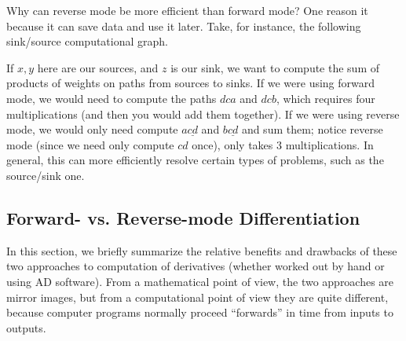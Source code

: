 \begin{figure}[ht]
\begin{center}
\end{center}
\end{figure}

Why can reverse mode be more efficient than forward mode? One reason it because it can save data and use it later. Take, for instance, the following sink/source computational graph.

If $x,y$ here are our sources, and $z$ is our sink, we want to compute the sum of products of weights on paths from sources to sinks. If we were using forward mode, we would need to compute the paths $dca$ and $dcb$, which requires four multiplications (and then you would add them together). If we were using reverse mode, we would only need compute $a\underline{cd}$ and $b\underline{cd}$ and sum them; notice reverse mode (since we need only compute $cd$ once), only takes 3 multiplications. In general, this can more efficiently resolve certain types of problems, such as the source/sink one.

\subsection{Forward- vs. Reverse-mode Differentiation}
\label{sec:forward-vs-reverse}

In this section, we briefly summarize the relative benefits and drawbacks of these two approaches to computation of derivatives (whether worked out by hand or using AD software).  From a mathematical point of view, the two approaches are mirror images, but from a computational point of view they are quite different, because computer programs normally proceed ``forwards'' in time from inputs to outputs.

